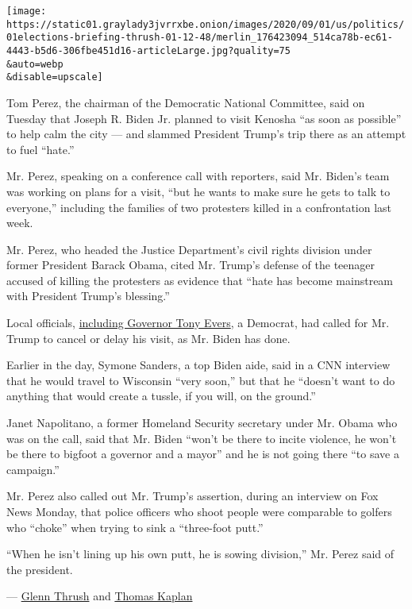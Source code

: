 \texttt{[image: https://static01.graylady3jvrrxbe.onion/images/2020/09/01/us/politics/01elections-briefing-thrush-01-12-48/merlin\_176423094\_514ca78b-ec61-4443-b5d6-306fbe451d16-articleLarge.jpg?quality=75\\\&auto=webp\\\&disable=upscale]}

Tom Perez, the chairman of the Democratic National Committee, said on
Tuesday that Joseph R. Biden Jr. planned to visit Kenosha ``as soon as
possible'' to help calm the city --- and slammed President Trump's trip
there as an attempt to fuel ``hate.''

Mr. Perez, speaking on a conference call with reporters, said Mr.
Biden's team was working on plans for a visit, ``but he wants to make
sure he gets to talk to everyone,'' including the families of two
protesters killed in a confrontation last week.

Mr. Perez, who headed the Justice Department's civil rights division
under former President Barack Obama, cited Mr. Trump's defense of the
teenager accused of killing the protesters as evidence that ``hate has
become mainstream with President Trump's blessing.''

Local officials,
\href{https://www.cnn.com/2020/08/30/politics/wisconsin-governor-letter-trump-kenosha-jacob-blake/index.html}{including
Governor Tony Evers}, a Democrat, had called for Mr. Trump to cancel or
delay his visit, as Mr. Biden has done.

Earlier in the day, Symone Sanders, a top Biden aide, said in a CNN
interview that he would travel to Wisconsin ``very soon,'' but that he
``doesn't want to do anything that would create a tussle, if you will,
on the ground.''

Janet Napolitano, a former Homeland Security secretary under Mr. Obama
who was on the call, said that Mr. Biden ``won't be there to incite
violence, he won't be there to bigfoot a governor and a mayor'' and he
is not going there ``to save a campaign.''

Mr. Perez also called out Mr. Trump's assertion, during an interview on
Fox News Monday, that police officers who shoot people were comparable
to golfers who ``choke'' when trying to sink a ``three-foot putt.''

``When he isn't lining up his own putt, he is sowing division,'' Mr.
Perez said of the president.

--- \href{https://www.nytimes3xbfgragh.onion/by/glenn-thrush}{Glenn
Thrush} and
\href{https://www.nytimes3xbfgragh.onion/by/thomas-kaplan}{Thomas
Kaplan}

